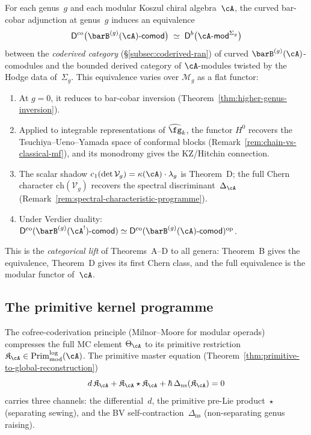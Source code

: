 \begin{conjecture}%
\label{conj:categorical-modular-kd}%
%
For each genus~$g$ and each modular Koszul chiral
algebra~$\cA$, the curved bar-cobar adjunction at genus~$g$
induces an equivalence
\[
\mathsf{D}^{\mathrm{co}}
\bigl(\barB^{(g)}(\cA)\text{-}\mathsf{comod}\bigr)
\;\simeq\;
\mathsf{D}^b\bigl(\cA\text{-}\mathsf{mod}^{\Sigma_g}\bigr)
\]
between the \emph{coderived category}
\textup{(}\S\textup{\ref{subsec:coderived-ran})} of curved
$\barB^{(g)}(\cA)$-comodules and the bounded derived category of
$\cA$-modules twisted by the Hodge data of~$\Sigma_g$.
This equivalence varies over $\mathcal{M}_g$ as a flat functor:
\begin{enumerate}[label=\textup{(\roman*)}]
\item At $g = 0$, it reduces to bar-cobar inversion
  \textup{(}Theorem~\textup{\ref{thm:higher-genus-inversion})}.
\item Applied to integrable representations of
  $\widehat{\fg}_k$, the functor $H^0$ recovers the
  Tsuchiya--Ueno--Yamada space of conformal blocks
  \textup{(}Remark~\textup{\ref{rem:chain-vs-classical-mf})},
  and its monodromy gives the KZ/Hitchin connection.
\item The scalar shadow
  $c_1(\det \mathcal{V}_g) = \kappa(\cA) \cdot \lambda_g$
  is Theorem~D; the full Chern character
  $\mathrm{ch}(\mathcal{V}_g)$
  recovers the spectral discriminant~$\Delta_{\cA}$
  \textup{(}Remark~\textup{\ref{rem:spectral-characteristic-programme})}.
\item Under Verdier duality:
  $\mathsf{D}^{\mathrm{co}}(\barB^{(g)}(\cA^!)\text{-}\mathsf{comod})
  \simeq
  \mathsf{D}^{\mathrm{co}}(\barB^{(g)}(\cA)\text{-}\mathsf{comod})^{\mathrm{op}}$.
\end{enumerate}
This is the \emph{categorical lift} of
Theorems~A--D to all genera: Theorem~B
gives the equivalence, Theorem~D gives its first Chern class,
and the full equivalence is the modular functor of~$\cA$.
\end{conjecture}

\subsection{The primitive kernel programme}
\label{sec:concordance-primitive-kernel}

The cofree-coderivation principle (Milnor--Moore for modular operads)
compresses the full MC element $\Theta_\cA$ to its primitive
restriction $\mathfrak K_\cA \in \operatorname{Prim}^{\log}_{\mathrm{mod}}(\cA)$.
The primitive master equation
(Theorem~\ref{thm:primitive-to-global-reconstruction})
\[
d\,\mathfrak K_\cA + \mathfrak K_\cA \star \mathfrak K_\cA
+ \hbar\,\Delta_{\mathrm{ns}}(\mathfrak K_\cA) = 0
\]
carries three channels: the differential~$d$, the primitive
pre-Lie product~$\star$ (separating sewing), and the BV
self-contraction~$\Delta_{\mathrm{ns}}$ (non-separating genus
raising).

